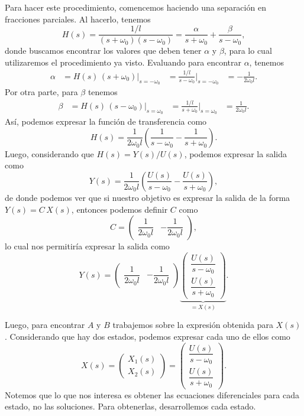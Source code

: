 \documentclass[
  11pt,
  letterpaper,
   addpoints,
  answers
  ]{exam}
\begin{document}
\begin{questions}
\begin{solution}
Para hacer este procedimiento, comencemos haciendo una separación en fracciones parciales. Al hacerlo, tenemos
\begin{equation}
H(s)=\frac{1/l}{(s+\omega_0)(s-\omega_0)}
=\frac{\alpha}{s+\omega_0}+\frac{\beta}{s-\omega_0},
\end{equation}
donde buscamos encontrar los valores que deben tener $\alpha$ y $\beta$, para lo cual utilizaremos el procedimiento ya visto. Evaluando para encontrar $\alpha$, tenemos
\begin{align}
\alpha
&=H(s)\,(s+\omega_0)\big|_{s=-\omega_0}
&=\frac{1/l}{s-\omega_0}\Big|_{s=-\omega_0}
&=-\frac{1}{2\omega_0 l}.
\end{align}
Por otra parte, para $\beta$ tenemos
\begin{align}
\beta
&=H(s)\,(s-\omega_0)\big|_{s=\omega_0}
&=\frac{1/l}{s+\omega_0}\Big|_{s=\omega_0}
&=\frac{1}{2\omega_0 l}.
\end{align}
Así, podemos expresar la función de transferencia como
\begin{equation}
H(s)=\frac{1}{2\omega_0 l}\left(\frac{1}{s-\omega_0}-\frac{1}{s+\omega_0}\right).
\end{equation}
Luego, considerando que $H(s)=Y(s)/U(s)$, podemos expresar la salida como
\begin{equation}
Y(s)=\frac{1}{2\omega_0 l}\left(\frac{U(s)}{s-\omega_0}-\frac{U(s)}{s+\omega_0}\right),
\end{equation}
de donde podemos ver que si nuestro objetivo es expresar la salida de la forma $Y(s)=C\,X(s)$, entonces podemos definir $C$ como
\begin{equation}
C=\begin{pmatrix}\dfrac{1}{2\omega_0 l}&-\dfrac{1}{2\omega_0 l}\end{pmatrix},
\end{equation}
lo cual nos permitiría expresar la salida como
\begin{equation}
Y(s)=\begin{pmatrix}\dfrac{1}{2\omega_0 l}&-\dfrac{1}{2\omega_0 l}\end{pmatrix}
\underbrace{
\begin{pmatrix}
\dfrac{U(s)}{s-\omega_0}\\[6pt]
\dfrac{U(s)}{s+\omega_0}
\end{pmatrix}
}_{=X(s)}.
\end{equation}

Luego, para encontrar $A$ y $B$ trabajemos sobre la expresión obtenida para $X(s)$. Considerando que hay dos estados, podemos expresar cada uno de ellos como
\begin{equation}
X(s)=
\begin{pmatrix}
X_1(s)\\[2pt]
X_2(s)
\end{pmatrix}
=
\begin{pmatrix}
\dfrac{U(s)}{s-\omega_0}\\[6pt]
\dfrac{U(s)}{s+\omega_0}
\end{pmatrix}.
\end{equation}
Notemos que lo que nos interesa es obtener las ecuaciones diferenciales para cada estado, no las soluciones. Para obtenerlas, desarrollemos cada estado.


\end{solution}
\end{questions}
\end{document}
